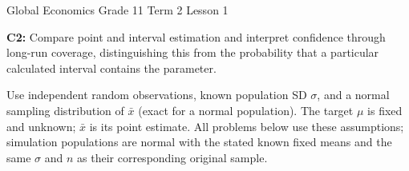 {
Global Economics \textbar{} Grade 11 \textbar{} Term 2 \textbar{} Lesson 1\par}
\textbf{C2:} Compare point and interval estimation and interpret confidence through long-run coverage, distinguishing this from the probability that a particular calculated interval contains the parameter.

Use independent random observations, known population SD $\sigma$, and a normal sampling distribution of $\bar{x}$ (exact for a normal population). The target $\mu$ is fixed and unknown; $\bar{x}$ is its point estimate. All problems below use these assumptions; simulation populations are normal with the stated known fixed means and the same $\sigma$ and $n$ as their corresponding original sample.

